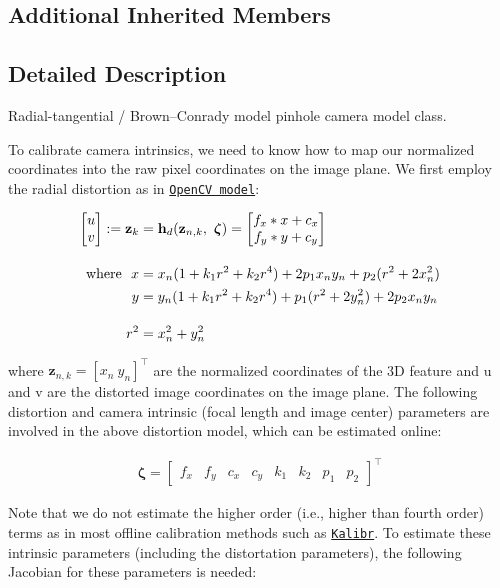 \subsection*{Additional Inherited Members}


\subsection{Detailed Description}
Radial-\/tangential / Brown–\+Conrady model pinhole camera model class. 

To calibrate camera intrinsics, we need to know how to map our normalized coordinates into the raw pixel coordinates on the image plane. We first employ the radial distortion as in \href{https://docs.opencv.org/3.4/da/d54/group__imgproc__transform.html#details}{\tt Open\+CV model}\+:

\begin{align*} \begin{bmatrix} u \\ v \end{bmatrix}:= \mathbf{z}_k &= \mathbf h_d(\mathbf{z}_{n,k}, ~\boldsymbol\zeta) = \begin{bmatrix} f_x * x + c_x \\ f_y * y + c_y \end{bmatrix}\\[1em] \empty {\rm where}~~ x &= x_n (1 + k_1 r^2 + k_2 r^4) + 2 p_1 x_n y_n + p_2(r^2 + 2 x_n^2) \\\ y &= y_n (1 + k_1 r^2 + k_2 r^4) + p_1 (r^2 + 2 y_n^2) + 2 p_2 x_n y_n \\[1em] r^2 &= x_n^2 + y_n^2 \end{align*}

where $ \mathbf{z}_{n,k} = [ x_n ~ y_n ]^\top$ are the normalized coordinates of the 3D feature and u and v are the distorted image coordinates on the image plane. The following distortion and camera intrinsic (focal length and image center) parameters are involved in the above distortion model, which can be estimated online\+:

\begin{align*} \boldsymbol\zeta = \begin{bmatrix} f_x & f_y & c_x & c_y & k_1 & k_2 & p_1 & p_2 \end{bmatrix}^\top \end{align*}

Note that we do not estimate the higher order (i.\+e., higher than fourth order) terms as in most offline calibration methods such as \href{https://github.com/ethz-asl/kalibr}{\tt Kalibr}. To estimate these intrinsic parameters (including the distortation parameters), the following Jacobian for these parameters is needed\+:

